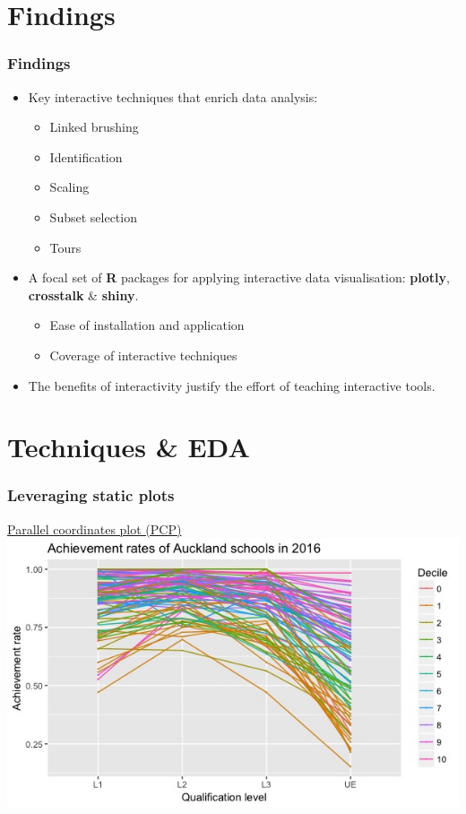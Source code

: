 \documentclass{beamer}
\begin{document}
\section{Findings}
\label{sec:findings}

	\begin{frame}
		\frametitle{Findings}
		\begin{itemize}
			\item Key interactive techniques that enrich data analysis:
			\begin{itemize}
				\item Linked brushing
				\item Identification
				\item Scaling
				\item Subset selection
				\item Tours
			\end{itemize}
			\item A focal set of \textbf{R} packages for applying interactive data visualisation: \textbf{plotly}, \textbf{crosstalk} \& \textbf{shiny}.
			\begin{itemize}
				\item Ease of installation and application
				\item Coverage of interactive techniques
			\end{itemize}
		\item The benefits of interactivity justify the effort of teaching interactive tools.
		\end{itemize}
	\end{frame}

\section{Techniques \& EDA}
\label{sec:techniques}

	\begin{frame}
		\frametitle{Leveraging static plots}
		\href{https://shanl33.shinyapps.io/presentation_pcp/}{Parallel coordinates plot (PCP)}
		\includegraphics[scale=0.45]{files/pcp.jpeg}
	\end{frame}
\end{document}
